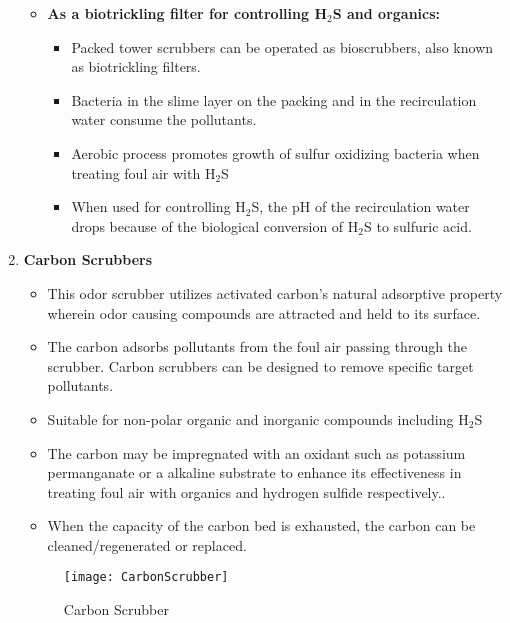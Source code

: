 \begin{enumerate}
\begin{itemize}
\item \textbf{As a biotrickling filter for controlling H$_2$S and organics:}\\
\begin{itemize} 
\item Packed tower scrubbers can be operated as bioscrubbers, also known as biotrickling filters.
\item Bacteria in the slime layer on the packing and in the recirculation water consume the pollutants.
\item Aerobic process promotes growth of sulfur oxidizing bacteria when treating foul air with H$_2$S
\item When used for controlling H$_2$S, the pH of the recirculation water drops because of the biological conversion of H$_2$S to sulfuric acid.
\end{itemize}
\end{itemize}
\newpage	
\item \textbf{Carbon Scrubbers}
\begin{itemize}
\item This odor scrubber utilizes activated carbon’s natural adsorptive property wherein odor causing compounds are attracted and held to its surface.
\item The carbon adsorbs pollutants from the foul air passing through the scrubber.
Carbon scrubbers can be designed to remove specific target pollutants.
\item Suitable for non-polar organic and inorganic compounds including H$_2$S
\item The carbon may be impregnated with an oxidant such as potassium permanganate or a alkaline substrate to enhance its effectiveness in treating foul air with organics and hydrogen sulfide respectively..
\item When the capacity of the carbon bed is exhausted, the carbon can be cleaned/regenerated or replaced.
\end{itemize}

\begin{figure}[htp]
	\begin{center}
		\texttt{[image: CarbonScrubber]}
			\caption{Carbon Scrubber}
	\end{center}
	

\end{figure}
\end{enumerate}
